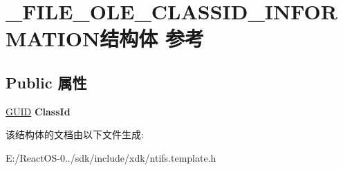 \hypertarget{struct___f_i_l_e___o_l_e___c_l_a_s_s_i_d___i_n_f_o_r_m_a_t_i_o_n}{}\section{\+\_\+\+F\+I\+L\+E\+\_\+\+O\+L\+E\+\_\+\+C\+L\+A\+S\+S\+I\+D\+\_\+\+I\+N\+F\+O\+R\+M\+A\+T\+I\+O\+N结构体 参考}
\label{struct___f_i_l_e___o_l_e___c_l_a_s_s_i_d___i_n_f_o_r_m_a_t_i_o_n}
\subsection*{Public 属性}
\begin{DoxyCompactItemize}
\item 
\mbox{\label{struct___f_i_l_e___o_l_e___c_l_a_s_s_i_d___i_n_f_o_r_m_a_t_i_o_n_a26a852618b9e781bba33ce8c149b7f8e}} 
\hyperlink{interface_g_u_i_d}{G\+U\+ID} {\bfseries Class\+Id}
\end{DoxyCompactItemize}


该结构体的文档由以下文件生成\+:\begin{DoxyCompactItemize}
\item 
E\+:/\+React\+O\+S-\/0../sdk/include/xdk/ntifs.\+template.\+h\end{DoxyCompactItemize}
